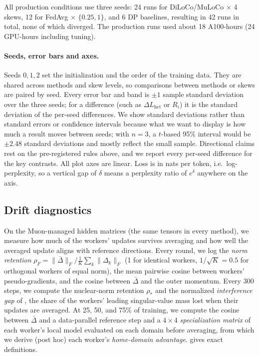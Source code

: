 \documentclass{article}
\newcommand{\Lhet}{\Delta L_{\mathrm{het}}}
\begin{document}
All production conditions use three seeds: 24 runs for DiLoCo/MuLoCo $\times$ 4 skews, 12 for FedAvg $\times$ $\{0.25, 1\}$, and 6 DP baselines, resulting in 42 runs in total, none of which diverged. The production runs used about 18 A100-hours (24 GPU-hours including tuning).

\paragraph{Seeds, error bars and axes.} Seeds $0, 1, 2$ set the initialization and the order of the training data. They are shared across methods and skew levels, so comparisons between methods or skews are paired by seed. Every error bar and band is $\pm 1$ sample standard deviation over the three seeds; for a difference (such as $\Lhet$ or $R_i$) it is the standard deviation of the per-seed differences. We show standard deviations rather than standard errors or confidence intervals because what we want to display is how much a result moves between seeds; with $n = 3$, a $t$-based 95\% interval would be $\pm 2.48$ standard deviations and mostly reflect the small sample. Directional claims rest on the pre-registered rules above, and we report every per-seed difference for the key contrasts. All plot axes are linear. Loss is in nats per token, i.e.\ log-perplexity, so a vertical gap of $\delta$ means a perplexity ratio of $e^{\delta}$ anywhere on the axis.

\subsection{Drift diagnostics}\label{sec:diagnostics}
On the Muon-managed hidden matrices (the same tensors in every method), we measure how much of the workers' updates survives averaging and how well the averaged update aligns with reference directions. Every round, we log the \emph{norm retention} $\rho_F = \lVert\bar\Delta\rVert_F / \frac1K\sum_k\lVert\Delta_k\rVert_F$ (1 for identical workers, $1/\sqrt{K} = 0.5$ for orthogonal workers of equal norm), the mean pairwise cosine between workers' pseudo-gradients, and the cosine between $\bar\Delta$ and the outer momentum. Every 300 steps, we compute the nuclear-norm retention $\rho_*$ and the normalized \emph{interference gap} of \citet{therien2025muloco}, the share of the workers' leading singular-value mass lost when their updates are averaged. At 25, 50, and 75\% of training, we compute the cosine between $\bar\Delta$ and a data-parallel reference step and a $4\times4$ \emph{specialization matrix} of each worker's local model evaluated on each domain before averaging, from which we derive (post hoc) each worker's \emph{home-domain advantage}.  gives exact definitions.
\end{document}
